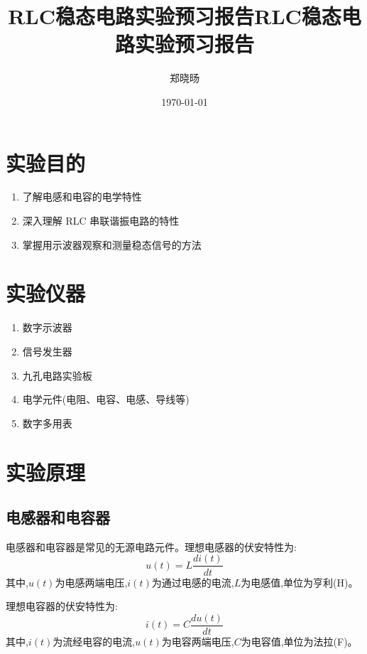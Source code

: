 \documentclass[UTF8]{ctexart}
\title{RLC稳态电路实验预习报告}
\title{RLC稳态电路实验预习报告}
\author{郑晓旸}
\date{\today}
\begin{document}
\fancyfoot[C]{\thepage}

\maketitle
\tableofcontents
\newpage

\section{实验目的}
    \begin{enumerate}
            \item 了解电感和电容的电学特性 
            \item 深入理解 RLC 串联谐振电路的特性
            \item 掌握用示波器观察和测量稳态信号的方法
    \end{enumerate} 


\section{实验仪器}
\begin{enumerate}
    \item 数字示波器
    \item 信号发生器
    \item 九孔电路实验板
    \item 电学元件(电阻、电容、电感、导线等)
    \item 数字多用表
\end{enumerate}
\section{实验原理}

\subsection{电感器和电容器}

电感器和电容器是常见的无源电路元件。理想电感器的伏安特性为:
\begin{equation}
u(t) = L\frac{di(t)}{dt}
\end{equation}
其中,$u(t)$为电感两端电压,$i(t)$为通过电感的电流,$L$为电感值,单位为亨利(H)。

理想电容器的伏安特性为:
\begin{equation}
i(t) = C\frac{du(t)}{dt}
\end{equation}
其中,$i(t)$为流经电容的电流,$u(t)$为电容两端电压,$C$为电容值,单位为法拉(F)。
\end{document}
